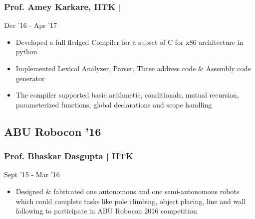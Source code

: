 \documentclass[letterpaper]{twentysecondcv} %
\begin{document}
\subsubsection{Prof. Amey Karkare, IITK | } \hfill{} Dec '16 - Apr '17

\begin{itemize}
\item Developed a full fledged Compiler for a subset of C for x86 architecture in python
\item Implemented Lexical Analyzer, Parser, Three address code \& Assembly code generator
\item The compiler supported basic arithmetic, conditionals, mutual recursion, parameterized functions, global declarations and scope handling
\end{itemize}


\subsection{ABU Robocon '16}
\subsubsection{Prof. Bhaskar Dasgupta | IITK} \hfill{} Sept '15 - Mar '16
\begin{itemize}
\item Designed \& fabricated one autonomous and one semi-autonomous robots which could complete tasks like pole climbing, object placing, line and wall following to participate in ABU Robocon 2016 competition
\end{itemize}

\end{document}
